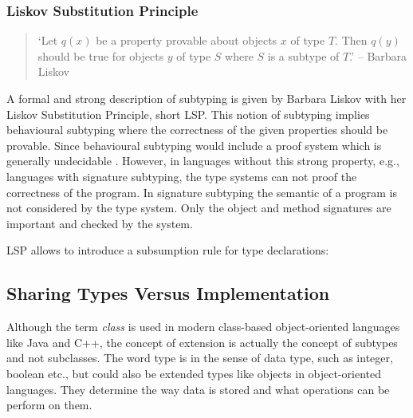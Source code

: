 \subsubsection{Liskov Substitution Principle}
\begin{quotation}
`Let $q(x)$ be a property provable about objects $x$ of type $T$. Then
$q(y)$ should be true for objects $y$ of type $S$ where $S$ is a subtype
of $T$.' -- Barbara Liskov \cite{liskov_behavioral_1999}
\end{quotation}

A formal and strong description of subtyping is given by Barbara
Liskov with her Liskov Substitution Principle, short LSP. This notion
of subtyping implies behavioural subtyping where the correctness
of the given properties should be provable. Since behavioural
subtyping would include a proof system which is generally undecidable
\cite{poll_behavioural_1998}. However, in languages without this strong
property, e.g., languages with signature subtyping, the type systems
can not proof the correctness of the program. In signature subtyping
the semantic of a program is not considered by the type system. Only 
the object and method signatures are important and checked by the system.

LSP allows to introduce a subsumption rule for type declarations:

\begin{defn}[Subsumption]
\label{def:methodSubtyping}
	\begin{mathpar}
	\end{mathpar}
\end{defn}


\subsection{Sharing Types Versus Implementation}
\label{sec:sharingTypes}

Although the term \emph{class} is used in modern class-based
object-oriented languages like Java and C++, the concept of extension is
actually the concept of subtypes and not subclasses. The word type is in
the sense of data type, such as integer, boolean etc., but could also be
extended types like objects in object-oriented languages. They determine
the way data is stored and what operations can be perform on them.

